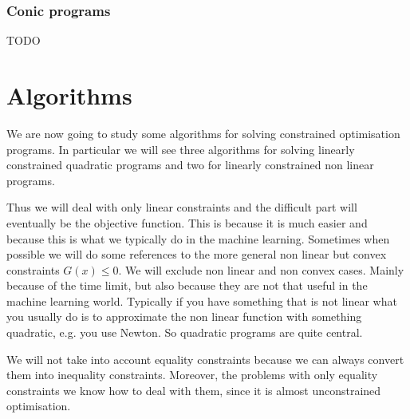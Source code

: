 \subsubsection{Conic programs}
TODO
%
%
%
\section{Algorithms}
\par We are now going to study some algorithms for solving constrained optimisation programs. In particular we will see three algorithms for solving linearly constrained quadratic programs and two for linearly constrained non linear programs.
\par Thus we will deal with only linear constraints and the difficult part will eventually be the objective function. This is because it is much easier and because this is what we typically do in the machine learning. Sometimes when possible we will do some references to the more general non linear but convex constraints $G(x) \leq 0$. We will exclude non linear and non convex cases. Mainly because of the time limit, but also because they are not that useful in the machine learning world. Typically if you have something that is not linear what you usually do is to approximate the non linear function with something quadratic, e.g. you use Newton. So quadratic programs are quite central.
\par We will not take into account equality constraints because we can always convert them into inequality constraints. Moreover, the problems with only equality constraints we know how to deal with them, since it is almost unconstrained optimisation.
%
